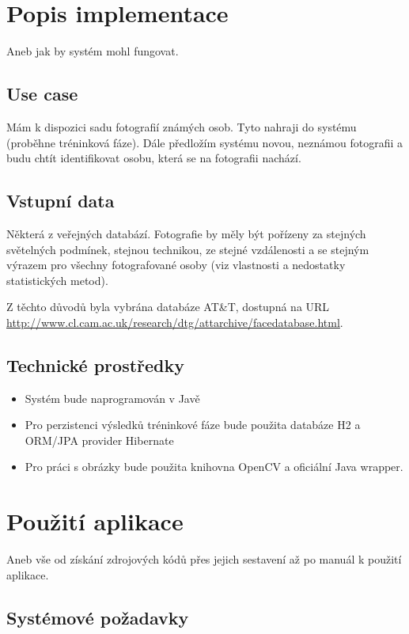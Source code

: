 \documentclass[10pt,a4paper]{article}
\begin{document}
\section{Popis implementace}

Aneb jak by systém mohl fungovat.

\subsection{Use case}

Mám k dispozici sadu fotografií známých osob. Tyto nahraji do systému (proběhne tréninková fáze). Dále předložím systému novou, neznámou fotografii a budu chtít identifikovat osobu, která se na fotografii nachází.

\subsection{Vstupní data}

Některá z veřejných databází. Fotografie by měly být pořízeny za stejných světelných podmínek, stejnou technikou, ze stejné vzdálenosti a se stejným výrazem pro všechny fotografované osoby (viz vlastnosti a nedostatky statistických metod).

Z těchto důvodů byla vybrána databáze AT\&T, dostupná na URL \url{http://www.cl.cam.ac.uk/research/dtg/attarchive/facedatabase.html}.

\subsection{Technické prostředky}

\begin{itemize}
	\item Systém bude naprogramován v Javě
	\item Pro perzistenci výsledků tréninkové fáze bude použita databáze H2 a ORM/JPA provider Hibernate
	\item Pro práci s obrázky bude použita knihovna OpenCV a oficiální Java wrapper.
\end{itemize}

\section{Použití aplikace}

Aneb vše od získání zdrojových kódů přes jejich sestavení až po manuál k použití aplikace.

\subsection{Systémové požadavky}
\end{document}
